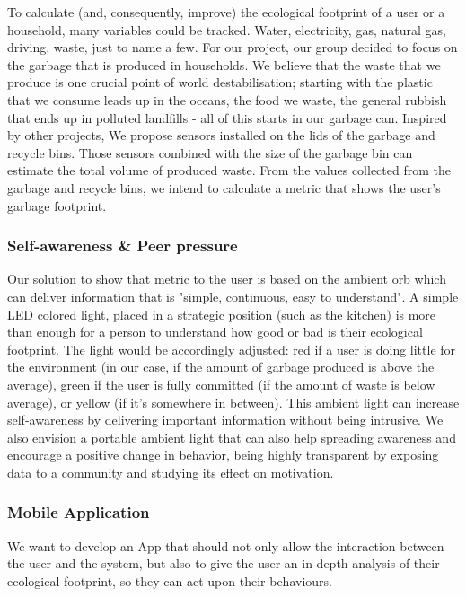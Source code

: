 \documentclass{sigchi-ext}
\begin{document}
To calculate (and, consequently, improve) the ecological footprint of a user or a household, many variables could be tracked. Water, electricity, gas, natural gas, driving, waste, just to name a few\cite{fang2014theoretical}. For our project, our group decided to focus on the garbage that is produced in households. We believe that the waste that we produce is one crucial point of world destabilisation; starting with the plastic that we consume leads up in the oceans, the food we waste, the general rubbish that ends up in polluted landfills - all of this starts in our garbage can.
Inspired by other projects\cite{7106974, 7848162}, We propose sensors installed on the lids of the garbage and recycle bins. Those sensors combined with the size of the garbage bin can estimate the total volume of produced waste. From the values collected from the garbage and recycle bins, we intend to calculate a metric that shows the user's garbage footprint.

\subsubsection{Self-awareness \& Peer pressure}
Our solution to show that metric to the user is based on the ambient orb which can deliver information that is "simple, continuous, easy to understand"\cite{rose2014enchanted}. A simple LED colored light, placed in a strategic position (such as the kitchen) is more than enough for a person to understand how good or bad is their ecological footprint. The light would be accordingly adjusted: red if a user is doing little for the environment (in our case, if the amount of garbage produced is above the average), green if the user is fully committed (if the amount of waste is below average), or yellow (if it's somewhere in between). This ambient light can increase self-awareness by delivering important information without being intrusive. We also envision a portable ambient light that can also help spreading awareness and encourage a positive change in behavior, being highly transparent by exposing data to a community and studying its effect on motivation\cite{rose2014enchanted}.

\subsubsection{Mobile Application}
We want to develop an App that should not only allow the interaction between the user and the system, but also to give the user an in-depth analysis of their ecological footprint, so they can act upon their behaviours.
\end{document}
